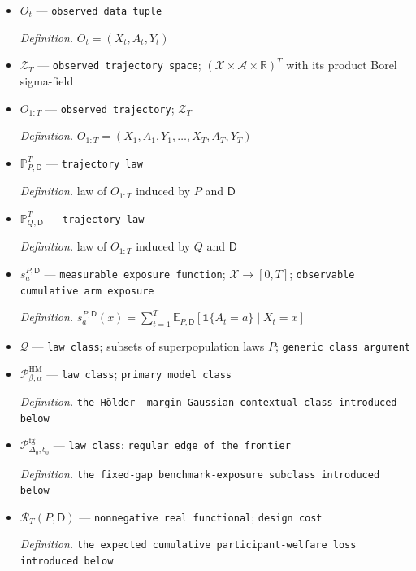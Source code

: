\documentclass{article}
\begin{document}
\begin{itemize}
  \par\smallskip\noindent\emph{Definition.} \(\varepsilon_t=\{Y_t-\mu_{A_t}(X_t)\}/\sigma\)
  \item \(O_t\) --- \texttt{observed data tuple}
  \par\smallskip\noindent\emph{Definition.} \(O_t=(X_t,A_t,Y_t)\)
  \item \(\mathcal Z_T\) --- \texttt{observed trajectory space}; \((\mathcal X\times\mathcal A\times\mathbb R)^T\) with its product Borel sigma-field
  \item \(O_{1:T}\) --- \texttt{observed trajectory}; \(\mathcal Z_T\)
  \par\smallskip\noindent\emph{Definition.} \(O_{1:T}=(X_1,A_1,Y_1,\ldots,X_T,A_T,Y_T)\)
  \item \(\mathbb P_{P,\mathsf D}^{T}\) --- \texttt{trajectory law}
  \par\smallskip\noindent\emph{Definition.} law of \(O_{1:T}\) induced by \(P\) and \(\mathsf D\)
  \item \(\mathbb P_{Q,\mathsf D}^{T}\) --- \texttt{trajectory law}
  \par\smallskip\noindent\emph{Definition.} law of \(O_{1:T}\) induced by \(Q\) and \(\mathsf D\)
  \item \(s_a^{P,\mathsf D}\) --- \texttt{measurable exposure function}; \(\mathcal X\to[0,T]\); \texttt{observable cumulative arm exposure}
  \par\smallskip\noindent\emph{Definition.} \(s_a^{P,\mathsf D}(x)=\sum_{t=1}^T\mathbb E_{P,\mathsf D}[\mathbf 1\{A_t=a\}\mid X_t=x]\)
  \item \(\mathcal Q\) --- \texttt{law class}; subsets of superpopulation laws \(P\); \texttt{generic class argument}
  \item \(\mathcal P_{\beta,\alpha}^{\mathrm{HM}}\) --- \texttt{law class}; \texttt{primary model class}
  \par\smallskip\noindent\emph{Definition.} \texttt{the Hölder-\allowbreak{}-\allowbreak{}margin Gaussian contextual class introduced below}
  \item \(\mathcal P_{\Delta_0,b_0}^{\mathrm{fg}}\) --- \texttt{law class}; \texttt{regular edge of the frontier}
  \par\smallskip\noindent\emph{Definition.} \texttt{the fixed-\allowbreak{}gap benchmark-\allowbreak{}exposure subclass introduced below}
  \item \(\mathcal R_T(P,\mathsf D)\) --- \texttt{nonnegative real functional}; \texttt{design cost}
  \par\smallskip\noindent\emph{Definition.} \texttt{the expected cumulative participant-\allowbreak{}welfare loss introduced below}

\end{itemize}
\end{document}
